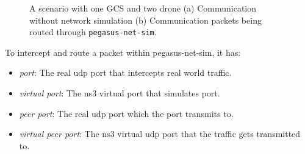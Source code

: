 \begin{figure} 
	\centering
	\caption[Example of \texttt{pegasus-net-sim} intercepting packets.]{\small 
		A scenario with one GCS and two drone (a) Communication without network simulation (b) Communication packets being routed through \texttt{pegasus-net-sim}.}
	
	\label{fig:pegasus-net-sim-simulation-example}
\end{figure}

To intercept and route a packet within pegasus-net-sim, it has:
\begin{itemize}
	\item \textit{port}: The real udp port that intercepts real world traffic.
	\item \textit{virtual port}: The ns3 virtual port that simulates port.
	\item \textit{peer port}: The real udp port which the port transmits to.
	\item \textit{virtual peer port}: The ns3 virtual udp port that the traffic gets transmitted to.
\end{itemize}


